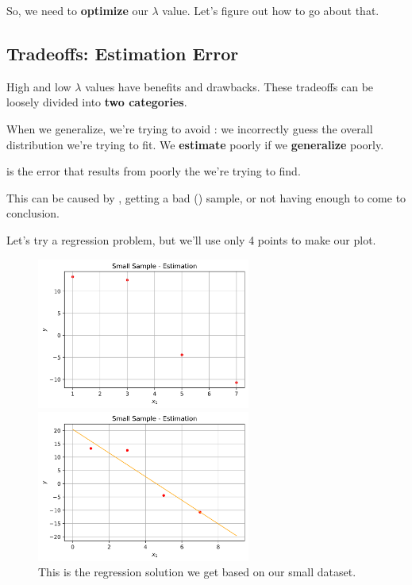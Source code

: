         So, we need to \textbf{optimize} our $\lambda$ value. Let's figure out how to go about that.
        
    \subsection{Tradeoffs: Estimation Error}
    
        High and low $\lambda$ values have benefits and drawbacks. These tradeoffs can be loosely divided into \textbf{two categories}.
        
        When we generalize, we're trying to avoid : we incorrectly guess the overall distribution we're trying to fit. We \textbf{estimate} poorly if we \textbf{generalize} poorly.\\
        
        \begin{definition}
             is the error that results from poorly  the  we're trying to find. 
            
            This can be caused by , getting a bad () sample, or not having enough  to come to conclusion.
        \end{definition}
        
        \miniex Let's try a regression problem, but we'll use only 4 points to make our plot.
        
        \begin{figure}[H]

            \includegraphics[width=70mm,scale=0.5]{images/regression_images/Estimation_Limited_Sample.png}

            \includegraphics[width=70mm,scale=0.5]{images/regression_images/Estimation_Limited_Sample_Regression.png}
        
            \caption*{This is the regression solution we get based on our small dataset.}
        \end{figure}
        
